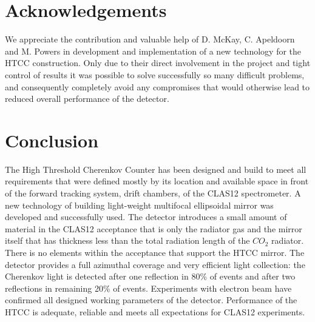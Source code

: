 \section{Acknowledgements}

\indent We appreciate the contribution and valuable help of D. McKay, C. Apeldoorn and M. Powers in development and implementation of a new technology for the HTCC construction. Only due to their direct involvement in the project and tight control of results it was possible to solve successfully so many difficult problems, and consequently completely avoid any compromises that would otherwise lead to reduced overall performance of the detector.

\section{Conclusion} The High Threshold Cherenkov Counter has been designed and build to meet all requirements that were defined mostly by its location and available space in front of the forward tracking system, drift chambers, of the CLAS12 spectrometer. A new technology of building light-weight multifocal ellipsoidal mirror was developed and successfully used. The detector introduces a small amount of material in the CLAS12 acceptance that is only the radiator gas and the mirror itself that has thickness less than the total radiation length of the $CO_{2}$ radiator. There is no elements within the acceptance that support the HTCC mirror. The detector provides a full azimuthal coverage and very efficient light collection: the Cherenkov light is detected after one reflection in 80\% of events and after two reflections in remaining 20\% of events. Experiments with electron beam have confirmed all designed working parameters of the detector. Performance of the HTCC is adequate, reliable and meets all expectations for CLAS12 experiments.



